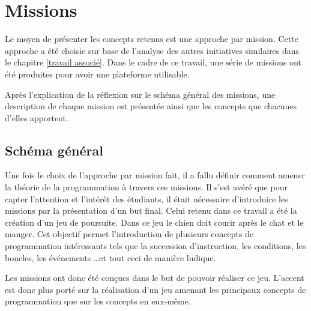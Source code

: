 \section{Missions}
\label{missions}
Le moyen de présenter les concepts retenus est une approche par mission. Cette approche a été choisie sur base de l'analyse des autres initiatives similaires dans le chapitre \ref{travail associé}. Dans le cadre de ce travail, une série de missions ont été produites pour avoir une plateforme utilisable.

Après l'explication de la réflexion sur le schéma général des missions, une description de chaque mission est présentée ainsi que les concepts que chacunes d'elles apportent.

\subsection{Schéma général}
Une fois le choix de l'approche par mission fait, il a fallu définir comment amener la théorie de la programmation à travers ces missions. Il s'est avéré que pour capter l'attention et l'intérêt des étudiants, il était nécessaire d'introduire les missions par la présentation d'un but final. Celui retenu dans ce travail a été la création d'un jeu de poursuite. Dans ce jeu le chien doit courir après le chat et le manger. Cet objectif permet l'introduction de plusieurs concepts de programmation intéressants tels que la succession d'instruction, les conditions, les boucles, les événements \ldots et tout ceci de manière ludique.

Les missions ont donc été conçues dans le but de pouvoir réaliser ce jeu. L'accent est donc plus porté sur la réalisation d'un jeu amenant les principaux concepts de programmation que sur les concepts en eux-même. %


% 

